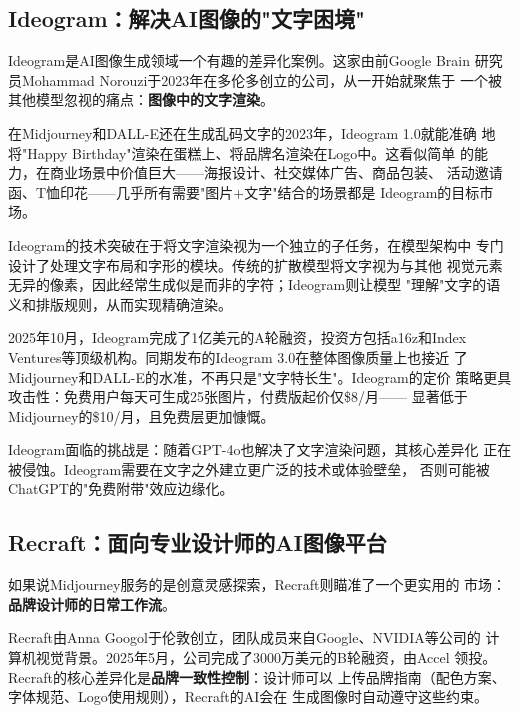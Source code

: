 \subsection{Ideogram：解决AI图像的"文字困境"}
\label{subsec:ideogram}

Ideogram是AI图像生成领域一个有趣的差异化案例。这家由前Google Brain
研究员Mohammad Norouzi于2023年在多伦多创立的公司，从一开始就聚焦于
一个被其他模型忽视的痛点：\textbf{图像中的文字渲染}。

在Midjourney和DALL-E还在生成乱码文字的2023年，Ideogram 1.0就能准确
地将"Happy Birthday"渲染在蛋糕上、将品牌名渲染在Logo中。这看似简单
的能力，在商业场景中价值巨大——海报设计、社交媒体广告、商品包装、
活动邀请函、T恤印花——几乎所有需要"图片+文字"结合的场景都是
Ideogram的目标市场。

Ideogram的技术突破在于将文字渲染视为一个独立的子任务，在模型架构中
专门设计了处理文字布局和字形的模块。传统的扩散模型将文字视为与其他
视觉元素无异的像素，因此经常生成似是而非的字符；Ideogram则让模型
"理解"文字的语义和排版规则，从而实现精确渲染。

2025年10月，Ideogram完成了1亿美元的A轮融资，投资方包括a16z和Index
Ventures等顶级机构。同期发布的Ideogram 3.0在整体图像质量上也接近
了Midjourney和DALL-E的水准，不再只是"文字特长生"。Ideogram的定价
策略更具攻击性：免费用户每天可生成25张图片，付费版起价仅\$8/月——
显著低于Midjourney的\$10/月，且免费层更加慷慨。

Ideogram面临的挑战是：随着GPT-4o也解决了文字渲染问题，其核心差异化
正在被侵蚀。Ideogram需要在文字之外建立更广泛的技术或体验壁垒，
否则可能被ChatGPT的"免费附带"效应边缘化。

\subsection{Recraft：面向专业设计师的AI图像平台}
\label{subsec:recraft}

如果说Midjourney服务的是创意灵感探索，Recraft则瞄准了一个更实用的
市场：\textbf{品牌设计师的日常工作流}。

Recraft由Anna Googol于伦敦创立，团队成员来自Google、NVIDIA等公司的
计算机视觉背景。2025年5月，公司完成了3000万美元的B轮融资，由Accel
领投。Recraft的核心差异化是\textbf{品牌一致性控制}：设计师可以
上传品牌指南（配色方案、字体规范、Logo使用规则），Recraft的AI会在
生成图像时自动遵守这些约束。

